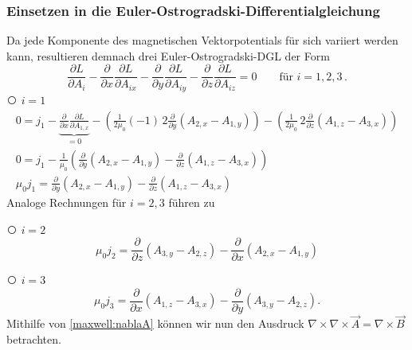 \subsubsection{Einsetzen in die Euler-Ostrogradski-Differentialgleichung}

Da jede Komponente des magnetischen Vektorpotentials für sich variiert werden kann, resultieren demnach drei Euler-Ostrogradski-DGL der Form
\[ 
\frac{\partial L}{\partial A_i} 
- \frac{\partial}{\partial x}\frac{\partial L}{\partial A_{ix}}
- \frac{\partial}{\partial y}\frac{\partial L}{\partial A_{iy}}
- \frac{\partial}{\partial z}\frac{\partial L}{\partial A_{iz}}
= 0 \qquad \text{für } i=1,2,3
\, . \]
{\larger\textcircled{}} $i = 1$
\begin{subequations}
	\label{maxwell:magnetoL1}
\begin{gather}
	0
	=
	j_1 - \underbrace{\frac{\partial}{\partial x}\frac{\partial L}{\partial A_{1,x}}}_{=0}
	 - \left( \frac{1}{2\mu_0}(-1)\,2 \frac{\partial}{\partial y}(A_{2,x}-A_{1,y})\right) 
	 - \left( \frac{1}{2\mu_0}\,2\frac{\partial}{\partial z}(A_{1,z}-A_{3,x})\right)
	 \\
	 0
	 =
	 j_1 - \frac{1}{\mu_0}\left( \frac{\partial}{\partial y}(A_{2,x}-A_{1,y})
	 - \frac{\partial}{\partial z}(A_{1,z}-A_{3,x})
	 \right)  
	 \\	 
	 \mu_0j_1
	 =
	 \frac{\partial}{\partial y}(A_{2,x}-A_{1,y})
	 - \frac{\partial}{\partial z}(A_{1,z}-A_{3,x})	 	 	 
\end{gather}
\end{subequations}
Analoge Rechnungen für $i = 2,3$ führen zu

{\larger\textcircled{}} $i = 2$
\begin{equation}
	\label{maxwell:magnetoL2}
	\mu_0j_2
	=
	\frac{\partial}{\partial z}(A_{3,y}-A_{2,z})
	- \frac{\partial}{\partial x}(A_{2,x}-A_{1,y})
\end{equation}

{\larger\textcircled{}} $i = 3$
\begin{equation}
	\label{maxwell:magnetoL3}
	\mu_0j_3
	=
	\frac{\partial}{\partial x}(A_{1,z}-A_{3,x})
	- \frac{\partial}{\partial y}(A_{3,y}-A_{2,z}).
\end{equation}
Mithilfe von \ref{maxwell:nablaA} können wir nun den Ausdruck $\nabla\times\nabla\times\vec{A} = \nabla\times\vec{B}$ betrachten.

